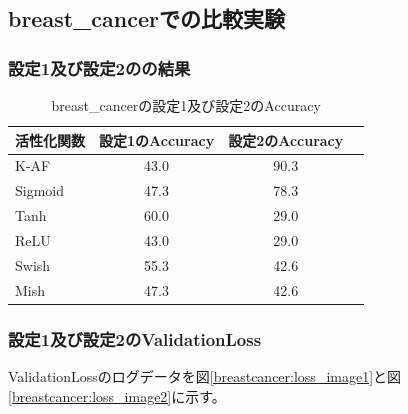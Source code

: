 \subsection{breast\_cancerでの比較実験}
\label{ev:breastcancer}

\subsubsection{設定1及び設定2のの結果}


\begin{table}[htbp]
    \begin{center}
        \caption{breast\_cancerの設定1及び設定2のAccuracy}
        \label{result:breastcancer}
        \vspace{2mm} 
        \begin{tabular}{l*{2}{c}r}
            活性化関数              & 設定1のAccuracy &  設定2のAccuracy \\
            \hline
            K-AF            & 43.0 & 90.3 \\
            Sigmoid            & 47.3 & 78.3\\
            Tanh            & 60.0 & 29.0\\
            ReLU        & 43.0 & 29.0\\
            Swish           & 55.3 & 42.6\\
            Mish           & 47.3 & 42.6\\
    
        \end{tabular}
    \end{center}
\end{table}




\subsubsection{設定1及び設定2のValidationLoss}
\label{breastcancer:loss}
ValidationLossのログデータを図\ref{breastcancer:loss_image1}と図\ref{breastcancer:loss_image2}に示す。


